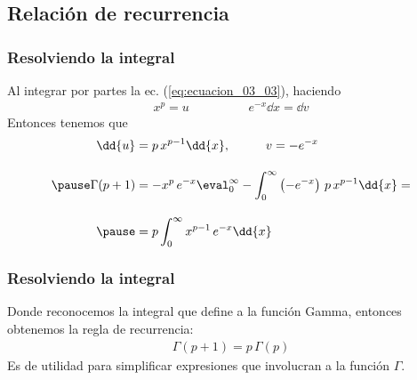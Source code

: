 \subsection{Relación de recurrencia}
\begin{frame}
\frametitle{Resolviendo la integral}
Al integrar por partes la ec. (\ref{eq:ecuacion_03_03}), haciendo
\begin{align*}
x^{p} =  u \hspace{2cm} e^{-x} \dd{x} =  \dd{v}
\end{align*}
\pause
Entonces tenemos que
\begin{eqnarray*}
\dd{u} &= p \, x^{p-1} \dd{x}, \hspace{1cm} v = - e^{-x} \\[1em]
\pause
\Gamma (p+1) &= -x^{p} \, e^{-x} \displaystyle \eval_{0}^{\infty} - \displaystyle \int_{0}^{\infty} \left(-e^{-x} \right) \, p \, x^{p-1} \dd{x} = \\[1em]
\pause
&= p \displaystyle \int_{0}^{\infty} x^{p-1} \, e^{-x} \dd{x}
\end{eqnarray*}
\end{frame}
\begin{frame}
\frametitle{Resolviendo la integral}
Donde reconocemos la integral que define a la función Gamma, entonces obtenemos la regla de recurrencia:  
\begin{align}
\boxed{\Gamma (p+1) = p \, \Gamma (p)}
\label{eq:ecuacion_03_04}
\end{align}
Es de utilidad para simplificar expresiones que involucran a la función $\Gamma$.
\end{frame}
